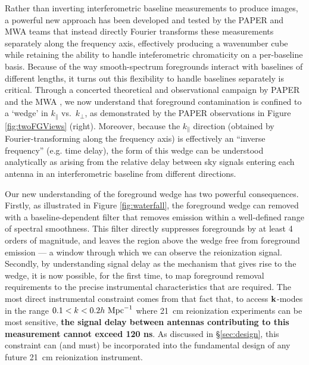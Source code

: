 \documentclass[preprint]{aastex}
\def\kperp{k_{\bot}}
\def\kpar{k_{\|}}
\def\kperp{k_{\bot}}
\def\kpar{k_{\|}}
\def\k{{\bf k}}
\begin{document}
Rather than inverting interferometric baseline measurements to produce images,
a powerful new approach has been developed and tested by the PAPER
and MWA teams that instead directly Fourier transforms these measurements separately along the frequency axis,
effectively producing a wavenumber cube while retaining the ability to handle inteferometric
chromaticity on a per-baseline basis.  Because of the way smooth-spectrum foregrounds
interact with baselines of different lengths, it turns out this flexibility to handle
baselines separately is critical.
Through a concerted theoretical and observational campaign by PAPER and the MWA
\citep{morales_et_al2012,parsons_et_al2012b,vedantham_2012,Datta_2010,hazelton_et_al2013,pober_et_al2013,parsons_et_al2013,dillon_et_al2013b},
we now understand that foreground contamination is confined to a `wedge' in
$\kpar$ vs.\ $\kperp$, as demonstrated by the PAPER observations in 
Figure \ref{fig:twoFGViews} (right).  Moreover, because the $\kpar$ direction (obtained by
Fourier-transforming along the frequency axis) is effectively an ``inverse frequency'' (e.g. time delay),
the form of this wedge can be understood analytically as arising from the relative delay between sky signals
entering each antenna in an interferometric baseline from different directions.

Our new understanding of the foreground wedge has two powerful consequences.
Firstly, as illustrated in Figure \ref{fig:waterfall}, the foreground wedge can
removed with a baseline-dependent filter that removes emission within a well-defined range of spectral smoothness.
This filter directly suppresses foregrounds by at least
4 orders of magnitude,  
and leaves the region above the wedge free from 
foreground emission --- a window through which we can observe the reionization signal.
Secondly, by understanding signal delay as the mechanism that gives rise to the wedge,
it is now possible, for the first time, to map foreground removal requirements 
to the precise instrumental characteristics that are required.  The most direct instrumental
constraint comes from that fact that, to access $\k$-modes in the range $0.1<k<0.2h\ {\rm Mpc}^{-1}$
where 21~cm reionization experiments can be most sensitive, {\bf the signal delay between antennas
contributing to this measurement cannot exceed 120 ns}.  As discussed in \S\ref{sec:design}, this
constraint can (and must) be incorporated into the fundamental design of any future 21~cm reionization instrument.
\end{document}

